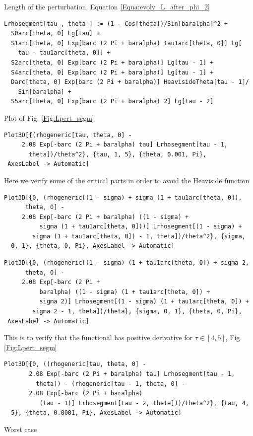 \documentclass[reqno]{amsart}
\theoremstyle{definition} \newtheorem{definition}{Definition}[section]
\theoremstyle{definition} \newtheorem{remark}[definition]{Remark}
\theoremstyle{plain} \newtheorem{lemma}[definition]{Lemma}
\theoremstyle{plain} \newtheorem{proposition}[definition]{Proposition}
\theoremstyle{plain} \newtheorem{theorem}[definition]{Theorem}
\theoremstyle{plain} \newtheorem{corollary}[definition]{Corollary}
\theoremstyle{definition} \newtheorem{example}[definition]{Example}
\theoremstyle{plain} \newtheorem{claim}[clai]{Claim}
\theoremstyle{definition} \newtheorem{assumption}[definition]{Assumption}
\theoremstyle{definition} \newtheorem{observation}[definition]{Observation}
\newcommand{\1}{\mathbbm 1}
\numberwithin{equation}{section} %
\theoremstyle{plain} \newtheorem*{theorem*}{Theorem}
\theoremstyle{plain} \newtheorem{mthm}[maintheorem]{Main Theorem}
\theoremstyle{plain} \newtheorem*{mthm*}{Main Theorem}
\theoremstyle{plain} \newtheorem*{conjecture*}{Conjecture}
\theoremstyle{plain} \newtheorem{conjecture}[definition]{Conjecture}
\theoremstyle{plain} \newtheorem*{problem*}{Problem}
\begin{document}
\noindent Length of the perturbation, Equation \eqref{Equa:evolv_L_after_phi_2}
\medskip
\begin{verbatim}
Lrhosegment[tau_, theta_] := (1 - Cos[theta])/Sin[baralpha]^2 + 
  S0arc[theta, 0] Lg[tau] + 
  S1arc[theta, 0] Exp[barc (2 Pi + baralpha) tau1arc[theta, 0]] Lg[
    tau - tau1arc[theta, 0]] + 
  S2arc[theta, 0] Exp[barc (2 Pi + baralpha)] Lg[tau - 1] + 
  S4arc[theta, 0] Exp[barc (2 Pi + baralpha)] Lg[tau - 1] + 
  Darc[theta, 0] Exp[barc (2 Pi + baralpha)] HeavisideTheta[tau - 1]/
    Sin[baralpha] + 
  S5arc[theta, 0] Exp[barc (2 Pi + baralpha) 2] Lg[tau - 2]
\end{verbatim}
\medskip
Plot of Fig. \ref{Fig:Lpert_segm}
\medskip
\begin{verbatim}
Plot3D[{(rhogeneric[tau, theta, 0] - 
     2.08 Exp[-barc (2 Pi + baralpha) tau] Lrhosegment[tau - 1, 
       theta])/theta^2}, {tau, 1, 5}, {theta, 0.001, Pi}, 
 AxesLabel -> Automatic]
\end{verbatim}
\medskip
Here we verify some of the critical parts in order to avoid the Heaviside function
\medskip
\begin{verbatim}
Plot3D[{0, (rhogeneric[(1 - sigma) + sigma (1 + tau1arc[theta, 0]), 
      theta, 0] - 
     2.08 Exp[-barc (2 Pi + baralpha) ((1 - sigma) + 
          sigma (1 + tau1arc[theta, 0]))] Lrhosegment[(1 - sigma) + 
        sigma (1 + tau1arc[theta, 0]) - 1, theta])/theta^2}, {sigma, 
  0, 1}, {theta, 0, Pi}, AxesLabel -> Automatic]
\end{verbatim}
\begin{verbatim}
Plot3D[{0, (rhogeneric[(1 - sigma) (1 + tau1arc[theta, 0]) + sigma 2, 
      theta, 0] - 
     2.08 Exp[-barc (2 Pi + 
          baralpha) ((1 - sigma) (1 + tau1arc[theta, 0]) + 
          sigma 2)] Lrhosegment[(1 - sigma) (1 + tau1arc[theta, 0]) + 
        sigma 2 - 1, theta])/theta}, {sigma, 0, 1}, {theta, 0, Pi}, 
 AxesLabel -> Automatic]
\end{verbatim}
\medskip
This is to verify that the functional has positive derivative for $\tau \in [4,5]$, Fig. \ref{Fig:Lpert_segm}
\medskip
\begin{verbatim}
Plot3D[{0, ((rhogeneric[tau, theta, 0] - 
       2.08 Exp[-barc (2 Pi + baralpha) tau] Lrhosegment[tau - 1, 
         theta]) - (rhogeneric[tau - 1, theta, 0] - 
       2.08 Exp[-barc (2 Pi + baralpha)
          (tau - 1)] Lrhosegment[tau - 2, theta]))/theta^2}, {tau, 4, 
  5}, {theta, 0.0001, Pi}, AxesLabel -> Automatic]
\end{verbatim}
\medskip
Worst case
\end{document}
